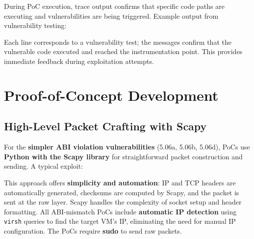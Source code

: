 \noindent
During PoC execution, trace output confirms that specific code paths are executing and vulnerabilities are being triggered. Example output from vulnerability testing:

\vspace{0.3cm}
\noindent
{}
\vspace{0.3cm}

\noindent
Each line corresponds to a vulnerability test; the messages confirm that the vulnerable code executed and reached the instrumentation point. This provides immediate feedback during exploitation attempts.

\section{Proof-of-Concept Development}

\subsection{High-Level Packet Crafting with Scapy}

For the \textbf{simpler ABI violation vulnerabilities} (5.06a, 5.06b, 5.06d), PoCs use \textbf{Python with the Scapy library} for straightforward packet construction and sending. A typical exploit:

\vspace{0.3cm}
\noindent
{}
\vspace{0.3cm}

\noindent
This approach offers \textbf{simplicity and automation}: IP and TCP headers are automatically generated, checksums are computed by Scapy, and the packet is sent at the raw layer. Scapy handles the complexity of socket setup and header formatting. All ABI-mismatch PoCs include \textbf{automatic IP detection} using \texttt{virsh} queries to find the target VM's IP, eliminating the need for manual IP configuration. The PoCs require \textbf{sudo} to send raw packets.

